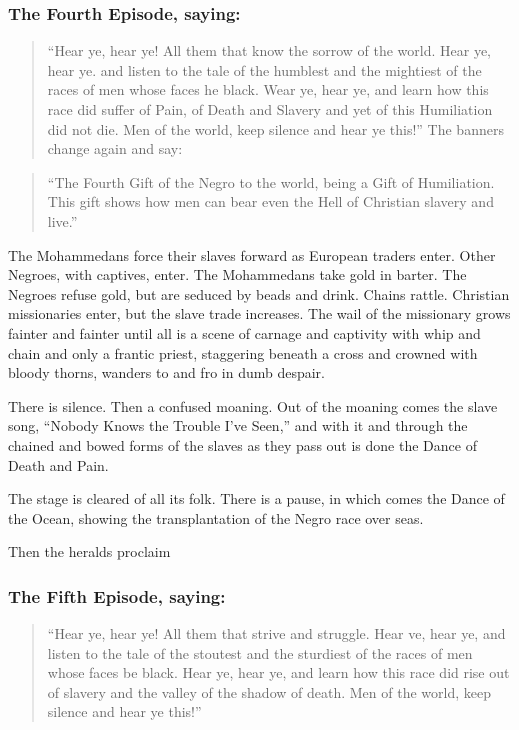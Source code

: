 \documentclass[letterpaper,10pt,english]{jupyterBook}
\begin{document}
\subsubsection{The Fourth Episode, saying:}
\label{\detokenize{Volumes/06/07/national_emancipation_exposition:the-fourth-episode-saying}}\begin{quote}

\sphinxAtStartPar
“Hear ye, hear ye! All them that know the sorrow of the world. Hear ye, hear ye. and listen to the tale of the humblest and the mightiest of the races of men whose faces he black. Wear ye, hear ye, and learn how this race did suffer of Pain, of Death and Slavery and yet of this Humiliation did not die. Men of the world, keep silence and hear ye this!” The banners change again and say:
\end{quote}
\begin{quote}

\sphinxAtStartPar
“The Fourth Gift of the Negro to the world, being a Gift of Humiliation. This gift shows how men can bear even the Hell of Christian slavery and live.”
\end{quote}

\sphinxAtStartPar
The Mohammedans force their slaves forward as European traders enter. Other Negroes, with captives, enter. The Mohammedans take gold in barter. The Negroes refuse gold, but are seduced by beads and drink. Chains rattle. Christian missionaries enter, but the slave trade increases. The wail of the missionary grows fainter and fainter until all is a scene of carnage and captivity with whip and chain and only a frantic priest, staggering beneath a cross and crowned with bloody thorns, wanders to and fro in dumb despair.

\sphinxAtStartPar
There is silence. Then a confused moaning. Out of the moaning comes the slave song, “Nobody Knows the Trouble I’ve Seen,” and with it and through the chained and bowed forms of the slaves as they pass out is done the Dance of Death and Pain.

\sphinxAtStartPar
The stage is cleared of all its folk. There is a pause, in which comes the Dance of the Ocean, showing the transplantation of the Negro race over seas.

\sphinxAtStartPar
Then the heralds proclaim


\subsubsection{The Fifth Episode, saying:}
\label{\detokenize{Volumes/06/07/national_emancipation_exposition:the-fifth-episode-saying}}\begin{quote}

\sphinxAtStartPar
“Hear ye, hear ye! All them that strive and struggle. Hear ve, hear ye, and listen to the tale of the stoutest and the sturdiest of the races of men whose faces be black. Hear ye, hear ye, and learn how this race did rise out of slavery and the valley of the shadow of death. Men of the world, keep silence and hear ye this!”
\end{quote}
\end{document}
